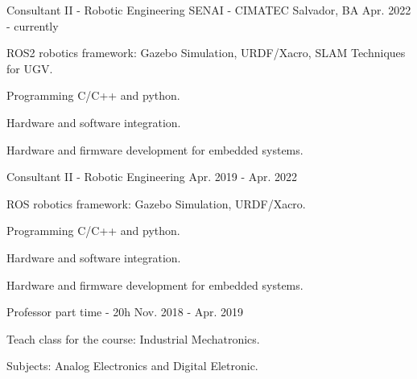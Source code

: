 

\begin{cventries}

\cventry
{Consultant II - Robotic Engineering} %
{SENAI - CIMATEC} %
{Salvador, BA} %
{Apr. 2022 - currently} %
{
  \begin{cvitems} %
    \item {ROS2 robotics framework: Gazebo Simulation, URDF/Xacro, SLAM Techniques for UGV.}
    \item {Programming C/C++ and python.}
    \item {Hardware and software integration.}
    \item {Hardware and firmware development for embedded systems.}
  \end{cvitems}
}

  \cventry
    {Consultant II - Robotic Engineering} %
    {} %
    {} %
    {Apr. 2019 - Apr. 2022} %
    {
      \begin{cvitems} %
        \item {ROS robotics framework: Gazebo Simulation, URDF/Xacro.}
        \item {Programming C/C++ and python.}
        \item {Hardware and software integration.}
        \item {Hardware and firmware development for embedded systems.}
      \end{cvitems}
    }

  \cventry
    {Professor part time - 20h} %
    {} %
    {} %
    {Nov. 2018 - Apr. 2019} %
    {
      \begin{cvitems} %
        \item {Teach class for the course: Industrial Mechatronics.}
        \item {Subjects: Analog Electronics and Digital Eletronic.}
      \end{cvitems}
    }


\end{cventries}
